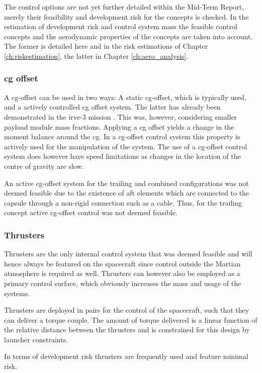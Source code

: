 The control options are not yet further detailed within the Mid-Term Report, merely their feasibility and development risk for the concepts is checked. In the estimation of development risk and control system mass the feasible control concepts and the aerodynamic properties of the concepts are taken into account. The former is detailed here and in the risk estimations of Chapter \ref{ch:riskestimation}, the latter in Chapter \ref{ch:aero_analysis}.

\subsubsection{\gls{cg} offset}
A \acrfull{cg}-offset can be used in two ways: A static \gls{cg}-offset, which is typically used, and a actively controlled \gls{cg} offset system. The latter has already been demonstrated in the \gls{irve}-3 mission \cite{Dillman2012}. This was, however, considering smaller payload module mass fractions. Applying a \gls{cg} offset yields a change in the moment balance around the \gls{cg}. In a \gls{cg}-offset control system this property is actively used for the manipulation of the system. The use of a \gls{cg}-offset control system does however have speed limitations as changes in the location of the centre of gravity are slow.

An active \gls{cg}-offset system for the trailing and combined configurations was not deemed feasible due to the existence of aft elements which are connected to the capsule through a non-rigid connection such as a cable. Thus, for the trailing concept active \gls{cg}-offset control was not deemed feasible.

\subsubsection{Thrusters}
Thrusters are the only internal control system that was deemed feasible and will hence always be featured on the spacecraft since control outside the Martian atmosphere is required as well. Thrusters can however also be employed as a primary control surface, which obviously increases the mass and usage of the systems.

Thrusters are deployed in pairs for the control of the spacecraft, such that they can deliver a torque couple. The amount of torque delivered is a linear function of the relative distance between the thrusters and is constrained for this design by launcher constraints. 

In terms of development risk thrusters are frequently used and feature minimal risk.


